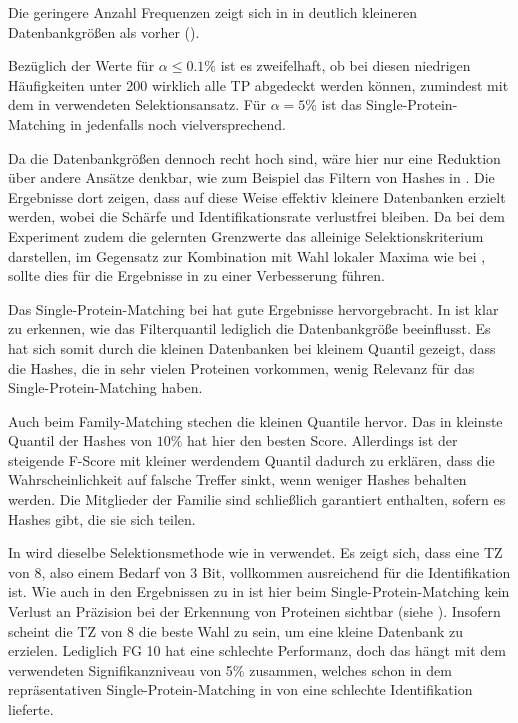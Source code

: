     Die geringere Anzahl Frequenzen zeigt sich in  in deutlich kleineren Datenbankgrößen als vorher ().

    Bezüglich der Werte für $\alpha \le 0.1\%$ ist es zweifelhaft, ob bei diesen niedrigen Häufigkeiten unter 200 wirklich alle \acf{TP} abgedeckt werden können, zumindest mit dem in  verwendeten Selektionsansatz. Für $\alpha=5\%$ ist das Single-Protein-Matching in  jedenfalls noch vielversprechend.

    Da die Datenbankgrößen dennoch recht hoch sind, wäre hier nur eine Reduktion über andere Ansätze denkbar, wie zum Beispiel das Filtern von Hashes in . Die Ergebnisse dort zeigen, dass auf diese Weise effektiv kleinere Datenbanken erzielt werden, wobei die Schärfe und Identifikationsrate verlustfrei bleiben. Da bei dem Experiment zudem die gelernten Grenzwerte das alleinige Selektionskriterium darstellen, im Gegensatz zur Kombination mit Wahl lokaler Maxima wie bei , sollte dies für die Ergebnisse in  zu einer Verbesserung führen.

    Das Single-Protein-Matching bei  hat gute Ergebnisse hervorgebracht. In  ist klar zu erkennen, wie das Filterquantil lediglich die Datenbankgröße beeinflusst. Es hat sich somit durch die kleinen Datenbanken bei kleinem Quantil gezeigt, dass die Hashes, die in sehr vielen Proteinen vorkommen, wenig Relevanz für das Single-Protein-Matching haben.

    Auch beim Family-Matching stechen die kleinen Quantile hervor. Das in  kleinste Quantil der Hashes von $10\%$ hat hier den besten Score. Allerdings ist der steigende F-Score mit kleiner werdendem Quantil dadurch zu erklären, dass die Wahrscheinlichkeit auf falsche Treffer sinkt, wenn weniger Hashes behalten werden. Die Mitglieder der Familie sind schließlich garantiert enthalten, sofern es Hashes gibt, die sie sich teilen.

    In  wird dieselbe Selektionsmethode wie in  verwendet. Es zeigt sich, dass eine \acf{TZ} von 8, also einem Bedarf von 3 Bit, vollkommen ausreichend für die Identifikation ist. Wie auch in den Ergebnissen zu  in  ist hier beim Single-Protein-Matching kein Verlust an Präzision bei der Erkennung von Proteinen sichtbar (siehe ). Insofern scheint die \ac{TZ} von 8 die beste Wahl zu sein, um eine kleine Datenbank zu erzielen. Lediglich \ac{FG} 10 hat eine schlechte Performanz, doch das hängt mit dem verwendeten Signifikanzniveau von 5\% zusammen, welches schon in dem repräsentativen Single-Protein-Matching in  von  eine schlechte Identifikation lieferte.

